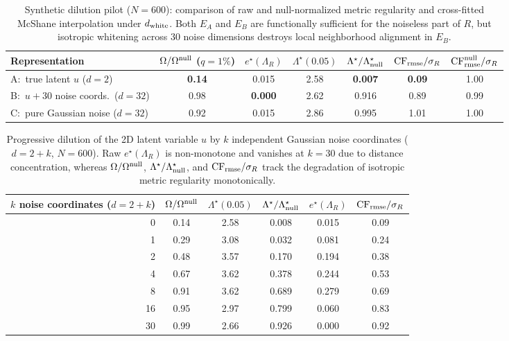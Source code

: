 \documentclass[preprint,11pt,a4paper]{elsarticle}
\begin{document}
\begin{table}[ht!]
\centering
\caption{Synthetic dilution pilot ($N=600$): comparison of raw and null-normalized metric regularity and cross-fitted McShane interpolation under $d_{\rm white}$. Both $E_A$ and $E_B$ are functionally sufficient for the noiseless part of $R$, but isotropic whitening across 30 noise dimensions destroys local neighborhood alignment in $E_B$.}
\label{tab:pilot1}
\footnotesize
\begin{tabular}{lcccccc}
\toprule
Representation & $\Omega/\Omega^{\rm null}$ ($q=1\%$) & $e^\star(\Lambda_R)$ & $\Lambda^\star(0.05)$ & $\Lambda^\star/\Lambda^\star_{\rm null}$ & ${\rm CF}_{\rm rmse}/\sigma_R$ & ${\rm CF}_{\rm rmse}^{\rm null}/\sigma_R$ \\
\midrule
A:\ true latent $u$ ($d=2$) & \textbf{0.14} & 0.015 & 2.58 & \textbf{0.007} & \textbf{0.09} & 1.00 \\
B:\ $u + 30$ noise coords.\ ($d=32$) & 0.98 & \textbf{0.000} & 2.62 & 0.916 & 0.89 & 0.99 \\
C:\ pure Gaussian noise ($d=32$) & 0.92 & 0.015 & 2.86 & 0.995 & 1.01 & 1.00 \\
\bottomrule
\end{tabular}
\end{table}

\begin{table}[ht!]
\centering
\caption{Progressive dilution of the 2D latent variable $u$ by $k$ independent Gaussian noise coordinates ($d=2+k$, $N=600$). Raw $e^\star(\Lambda_R)$ is non-monotone and vanishes at $k=30$ due to distance concentration, whereas $\Omega/\Omega^{\rm null}$, $\Lambda^\star/\Lambda^\star_{\rm null}$, and ${\rm CF}_{\rm rmse}/\sigma_R$ track the degradation of isotropic metric regularity monotonically.}
\label{tab:pilot2}
\footnotesize
\begin{tabular}{rccccc}
\toprule
$k$ noise coordinates ($d=2+k$) & $\Omega/\Omega^{\rm null}$ & $\Lambda^\star(0.05)$ & $\Lambda^\star/\Lambda^\star_{\rm null}$ & $e^\star(\Lambda_R)$ & ${\rm CF}_{\rm rmse}/\sigma_R$ \\
\midrule
0  & 0.14 & 2.58 & 0.008 & 0.015 & 0.09 \\
1  & 0.29 & 3.08 & 0.032 & 0.081 & 0.24 \\
2  & 0.48 & 3.57 & 0.170 & 0.194 & 0.38 \\
4  & 0.67 & 3.62 & 0.378 & 0.244 & 0.53 \\
8  & 0.91 & 3.62 & 0.689 & 0.279 & 0.69 \\
16 & 0.95 & 2.97 & 0.799 & 0.060 & 0.83 \\
30 & 0.99 & 2.66 & 0.926 & 0.000 & 0.92 \\
\bottomrule
\end{tabular}
\end{table}
\end{document}
